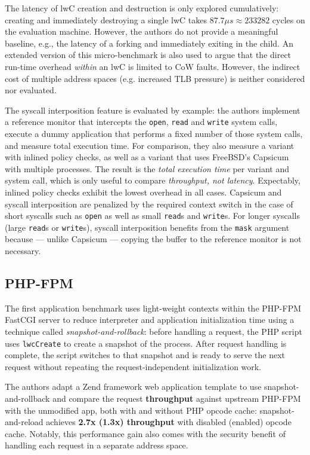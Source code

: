 \documentclass[10pt,twocolumn,a4paper]{article}
\begin{document}
The latency of lwC creation and destruction is only explored cumulatively: creating and immediately destroying a single lwC takes $87.7\mu s \approx 233282$ cycles on the evaluation machine. %
However, the authors do not provide a meaningful baseline, e.g., the latency of a forking and immediately exiting in the child.
An extended version of this micro-benchmark is also used to argue that the direct run-time overhead \textit{within} an lwC is limited to CoW faults.
However, the indirect cost of multiple address spaces (e.g. increased TLB pressure) is neither considered nor evaluated.
\cite{lwcpaper}

The syscall interposition feature is evaluated by example:
the authors implement a reference monitor that intercepts the \lstinline{open}, \lstinline{read} and \lstinline{write} system calls, execute a dummy application that performs a fixed number of those system calls, and measure total execution time.
For comparison, they also measure a variant with inlined policy checks, as well as a variant that uses FreeBSD's Capsicum with multiple processes.
The result is the \textit{total execution time} per variant and system call, which is only useful to compare \textit{throughput, not latency}.
Expectably, inlined policy checks exhibit the lowest overhead in all cases.
Capsicum and syscall interposition are penalized by the required context switch in the case of short syscalls such as \lstinline{open} as well as small \lstinline{read}s and \lstinline{write}s.
For longer syscalls (large \lstinline{read}s or \lstinline{write}s), syscall interposition benefits from the \lstinline{mask} argument because --- unlike Capsicum --- copying the buffer to the reference monitor is not necessary.
\cite{lwcpaper}

\subsection{PHP-FPM}
The first application benchmark uses light-weight contexts within the PHP-FPM FastCGI server to reduce interpreter and application initialization time using a technique called \textit{snapshot-and-rollback}:
before handling a request, the PHP script uses \lstinline{lwcCreate} to create a snapshot of the process.
After request handling is complete, the script switches to that snapshot and is ready to serve the next request without repeating the request-independent initialization work.
\cite{lwcpaper}

The authors adapt a Zend framework web application template to use snapshot-and-rollback and compare the request \textbf{throughput} against upstream PHP-FPM with the unmodified app, both with and without PHP opcode cache:
snapshot-and-reload achieves \textbf{2.7x (1.3x) throughput} with disabled (enabled) opcode cache.
Notably, this performance gain also comes with the security benefit of handling each request in a separate address space.\cite{zend,lwcpaper}
\end{document}
